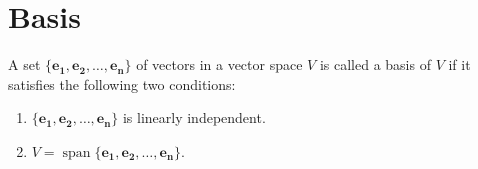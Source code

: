 \documentclass[20pt,a4paper]{extarticle}
\DeclareMathOperator{\Span}{span}
\newcounter{definition}
\begin{document}
\begin{solution}

\end{solution}

\vfill 




\newpage 

\section{Basis}


\begin{definition}
A set $\{ \mathbf{e_1} , \mathbf{e_2} , \ldots , \mathbf{e_n} \}$ of vectors in a vector space $V$ is called a basis of $V$ if it satisfies the following two conditions:
	\begin{enumerate}[label=\Circled{\arabic*}]
		\item $\{ \mathbf{e_1} , \mathbf{e_2} , \ldots , \mathbf{e_n} \}$ is linearly independent.
		\item $V = \Span \{ \mathbf{e_1} , \mathbf{e_2} , \ldots , \mathbf{e_n} \}$. 
	\end{enumerate}
\end{definition}
\end{document}
